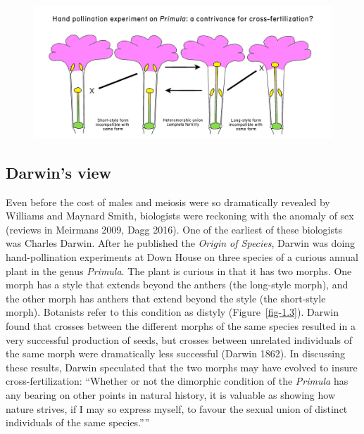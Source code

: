 \documentclass[
  letterpaper,
]{book}
\begin{document}
\begin{figure}


{\centering \includegraphics[width=1.25\textwidth,height=\textheight]{images/fig1-3.jpg}

}

\end{figure}

\hypertarget{darwins-view}{%
\subsection{Darwin's view}\label{darwins-view}}

Even before the cost of males and meiosis were so dramatically revealed
by Williams and Maynard Smith, biologists were reckoning with the
anomaly of sex (reviews in Meirmans 2009, Dagg 2016). One of the
earliest of these biologists was Charles Darwin. After he published the
\emph{Origin of Species}, Darwin was doing hand-pollination experiments
at Down House on three species of a curious annual plant in the genus
\emph{Primula}. The plant is curious in that it has two morphs. One
morph has a style that extends beyond the anthers (the long-style
morph), and the other morph has anthers that extend beyond the style
(the short-style morph). Botanists refer to this condition as distyly
(Figure~\ref{fig-1.3}). Darwin found that crosses between the different
morphs of the same species resulted in a very successful production of
seeds, but crosses between unrelated individuals of the same morph were
dramatically less successful (Darwin 1862). In discussing these results,
Darwin speculated that the two morphs may have evolved to insure
cross-fertilization: ``Whether or not the dimorphic condition of the
\emph{Primula} has any bearing on other points in natural history, it is
valuable as showing how nature strives, if I may so express myself, to
favour the sexual union of distinct individuals of the same species.''''
\end{document}
